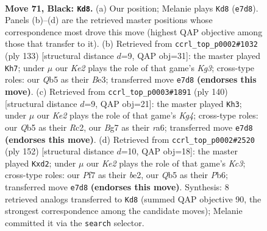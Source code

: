 \documentclass[11pt]{article}
\begin{document}
\clearpage

\begin{figure}[p]\centering
\begin{subfigure}{0.46\textwidth}\centering
\resizebox{\linewidth}{!}{%
\newchessgame
\chessboard[
  setfen={8/3Pkpb1/8/1q6/8/8/7K/8 b - - 6 71},
  showmover=false,
  pgfstyle=straightmove, color=movearrow, markmove={e7-d8}
]}
\caption{}
\end{subfigure}\hfill
\begin{subfigure}{0.46\textwidth}\centering
\resizebox{\linewidth}{!}{%
\newchessgame
\chessboard[
  setfen={8/8/6k1/3B2Pp/8/4b3/6K1/8 b - - 7 67},
  showmover=false,
  pgfstyle=straightmove, color=movearrow, markmove={g6-h7}
]}
\caption{}
\end{subfigure}
\\[4pt]
\begin{subfigure}{0.46\textwidth}\centering
\resizebox{\linewidth}{!}{%
\newchessgame
\chessboard[
  setfen={8/6k1/r7/8/6KP/6p1/2R5/8 w - - 10 71},
  showmover=false,
  pgfstyle=straightmove, color=movearrow, markmove={g4-h3}
]}
\caption{}
\end{subfigure}\hfill
\begin{subfigure}{0.46\textwidth}\centering
\resizebox{\linewidth}{!}{%
\newchessgame
\chessboard[
  setfen={8/8/1P2k3/2B5/8/2K5/3pb3/8 w - - 0 77},
  showmover=false,
  pgfstyle=straightmove, color=movearrow, markmove={c3-d2}
]}
\caption{}
\end{subfigure}
\caption{\textbf{Move 71, Black: \texttt{Kd8}.} (a) Our position; Melanie plays \texttt{Kd8} (\texttt{e7d8}). Panels (b)--(d) are the retrieved master positions whose correspondence most drove this move (highest QAP objective among those that transfer to it). (b) Retrieved from \texttt{ccrl\_top\_p0002\#1032} (ply 133) [structural distance $d$=9, QAP obj=31]: the master played \texttt{Kh7}; under $\mu$ our \emph{Ke2} plays the role of that game's \emph{Kg3}; cross-type roles: our \emph{Q}b5 as their \emph{B}e3; transferred move \texttt{e7d8} \textbf{(endorses this move)}. (c) Retrieved from \texttt{ccrl\_top\_p0003\#1891} (ply 140) [structural distance $d$=9, QAP obj=21]: the master played \texttt{Kh3}; under $\mu$ our \emph{Ke2} plays the role of that game's \emph{Kg4}; cross-type roles: our \emph{Q}b5 as their \emph{R}c2, our \emph{B}g7 as their \emph{r}a6; transferred move \texttt{e7d8} \textbf{(endorses this move)}. (d) Retrieved from \texttt{ccrl\_top\_p0002\#2520} (ply 152) [structural distance $d$=10, QAP obj=18]: the master played \texttt{Kxd2}; under $\mu$ our \emph{Ke2} plays the role of that game's \emph{Kc3}; cross-type roles: our \emph{P}f7 as their \emph{b}e2, our \emph{Q}b5 as their \emph{P}b6; transferred move \texttt{e7d8} \textbf{(endorses this move)}. Synthesis: 8 retrieved analogs transferred to \texttt{Kd8} (summed QAP objective 90, the strongest correspondence among the candidate moves); Melanie committed it via the \texttt{search} selector.}
\label{fig:thought-m141}
\end{figure}
\end{document}
